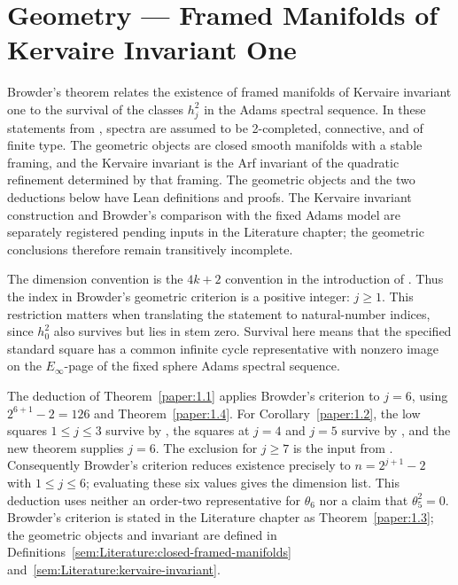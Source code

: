 \chapter{Geometry --- Framed Manifolds of Kervaire Invariant One}
Browder's theorem relates the existence of framed manifolds of Kervaire invariant one to the survival of the classes $h_j^2$ in the Adams spectral sequence. In these statements from \cite{LWX126}, spectra are assumed to be 2-completed, connective, and of finite type. The geometric objects are closed smooth manifolds with a stable framing, and the Kervaire invariant is the Arf invariant of the quadratic refinement determined by that framing. The geometric objects and the two deductions below have Lean definitions and proofs. The Kervaire invariant construction and Browder's comparison with the fixed Adams model are separately registered pending inputs in the Literature chapter; the geometric conclusions therefore remain transitively incomplete.

The dimension convention is the $4k+2$ convention in the introduction of
\cite{LWX126}. Thus the index in Browder's geometric criterion is a positive
integer: $j\geq 1$. This restriction matters when translating the statement
to natural-number indices, since $h_0^2$ also survives but lies in stem zero.
Survival here means that the specified standard square has a common infinite
cycle representative with nonzero image on the $E_\infty$-page of the fixed
sphere Adams spectral sequence.

The deduction of Theorem~\ref{paper:1.1} applies Browder's criterion to
$j=6$, using $2^{6+1}-2=126$ and Theorem~\ref{paper:1.4}.
For Corollary~\ref{paper:1.2}, the low squares $1\leq j\leq 3$ survive by
\cite{MayThesis1964}, the squares at $j=4$ and $j=5$ survive by
\cite{MahowaldTangora,BJMtheta5}, and the new theorem supplies $j=6$.
The exclusion for $j\geq 7$ is the input from \cite{HHR}.
Consequently Browder's criterion reduces existence precisely to
$n=2^{j+1}-2$ with $1\leq j\leq 6$; evaluating these six values gives the
dimension list. This deduction uses neither an order-two representative
for $\theta_6$ nor a claim that $\theta_5^2=0$.
Browder's criterion is stated in the Literature chapter as Theorem~\ref{paper:1.3}; the geometric objects and invariant are defined in Definitions~\ref{sem:Literature:closed-framed-manifolds} and~\ref{sem:Literature:kervaire-invariant}.

